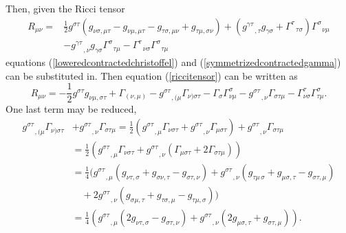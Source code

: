 \documentclass[11pt]{article}
\newcommand{\blank}{\enspace}
\newcommand{\blankt}{\text{ }}
\numberwithin{equation}{section}
\begin{document}
Then, given the Ricci tensor
\begin{equation}\label{riccitensor}
\begin{split}
    R_{\mu\nu} = &\frac12g^{\sigma\tau}(g_{\nu\sigma,\mu\tau} - g_{\nu\mu,\mu\tau} - g_{\tau\sigma,\mu\nu} + g_{\tau\mu,\sigma\nu}) + (g^{\gamma\tau}_{\blank\blankt,\tau}g_{\gamma\sigma} 
    + \Gamma^{\tau}_{\blankt\tau\sigma})\Gamma^{\sigma}_{\blankt\nu\mu} \\
    &- g^{\gamma\tau}_{\blank\blankt,\nu}g_{\gamma\sigma}\Gamma^{\sigma}_{\blankt\tau\mu} - \Gamma^{\tau}_{\blankt\nu\sigma}\Gamma^{\sigma}_{\blankt\tau\mu}
\end{split}
\end{equation}
equations (\ref{loweredcontractedchristoffel}) and (\ref{symmetrizedcontractedgamma}) can be substituted in. Then equation (\ref{riccitensor}) can be written as
\begin{equation}\label{riccitensornew}
    R_{\mu\nu} = -\frac12g^{\sigma\tau}g_{\nu\mu,\sigma\tau} + \Gamma_{(\nu,\mu)} - g^{\sigma\tau}_{\blank\blankt,(\mu}\Gamma^{\phantom{\sigma\tau}}_{\nu)\sigma\tau} - \Gamma_{\sigma}\Gamma^{\sigma}_{\nu\mu} - g^{\sigma\tau}_{\blank\blankt,\nu}\Gamma_{\sigma\tau\mu} - \Gamma^{\tau}_{\nu\sigma}\Gamma^{\sigma}_{\tau\mu}.
\end{equation}
One last term may be reduced, 
\begin{equation}\label{intermediatemetricchristoffel}
    \begin{split}
        g^{\sigma\tau}_{\blank\blankt,(\mu}\Gamma^{\phantom{\sigma\tau}}_{\nu)\sigma\tau} &+ g^{\sigma\tau}_{\blank\blankt,\nu}\Gamma_{\sigma\tau\mu} = \frac12(g^{\sigma\tau}_{\blank\blankt,\mu}\Gamma_{\nu\sigma\tau} + g^{\sigma\tau}_{\blank\blankt,\nu}\Gamma_{\mu\sigma\tau}) + g^{\sigma\tau}_{\blank\blankt,\nu}\Gamma_{\sigma\tau\mu} \\
        & = \frac12(g^{\sigma\tau}_{\blank\blankt,\mu}\Gamma_{\nu\sigma\tau} + g^{\sigma\tau}_{\blank\blankt,\nu}(\Gamma_{\mu\sigma\tau} + 2\Gamma_{\sigma\tau\mu})) \\ 
        &= \frac14(g^{\sigma\tau}_{\blank\blankt,\mu}(g_{\nu\tau,\sigma} + g_{\sigma\nu,\tau} - g_{\sigma\tau,\nu}) + g^{\sigma\tau}_{\blank\blankt,\nu}(g_{\tau\mu\,\sigma} + g_{\mu\sigma,\tau} - g_{\sigma\tau,\mu}) \\
        &\quad+ 2g^{\sigma\tau}_{\blank\blankt,\nu}(g_{\sigma\mu,\tau} + g_{\tau\sigma,\mu} - g_{\tau\mu,\sigma})) \\
        &= \frac14(g^{\sigma\tau}_{\blank\blankt,\mu}(2g_{\nu\tau,\sigma} - g_{\sigma\tau,\nu}) + g^{\sigma\tau}_{\blank\blankt,\nu}(2g_{\mu\sigma,\tau} + g_{\sigma\tau,\mu})).
    \end{split}
\end{equation}
\end{document}
